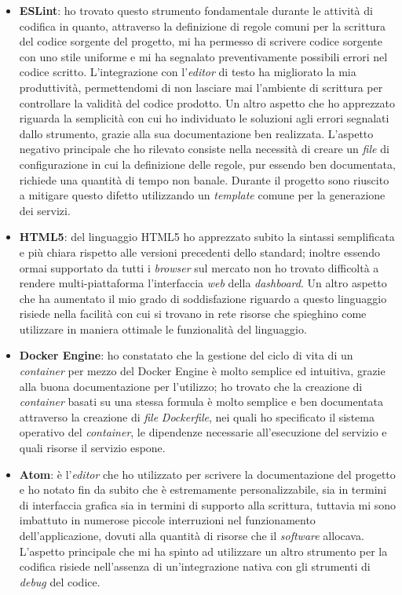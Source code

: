 \begin{itemize}
  \item \textbf{ESLint}: ho trovato questo strumento fondamentale durante le attività di codifica in quanto, attraverso la definizione di regole comuni per la scrittura del codice sorgente del progetto, mi ha permesso di scrivere codice sorgente con uno stile uniforme e mi ha segnalato preventivamente possibili errori nel codice scritto. L'integrazione con l'\emph{editor} di testo ha migliorato la mia produttività, permettendomi di non lasciare mai l'ambiente di scrittura per controllare la validità del codice prodotto. Un altro aspetto che ho apprezzato riguarda la semplicità con cui ho individuato le soluzioni agli errori segnalati dallo strumento, grazie alla sua documentazione ben realizzata. L'aspetto negativo principale che ho rilevato consiste nella necessità di creare un \emph{file} di configurazione in cui la definizione delle regole, pur essendo ben documentata, richiede una quantità di tempo non banale. Durante il progetto sono riuscito a mitigare questo difetto utilizzando un \emph{template} comune per la generazione dei servizi.
  \item \textbf{HTML5}: del linguaggio HTML5 ho apprezzato subito la sintassi semplificata e più chiara rispetto alle versioni precedenti dello standard; inoltre essendo ormai supportato da tutti i \emph{browser} sul mercato non ho trovato difficoltà a rendere multi-piattaforma l'interfaccia \emph{web} della \emph{dashboard}. Un altro aspetto che ha aumentato il mio grado di soddisfazione riguardo a questo linguaggio risiede nella facilità con cui si trovano in rete risorse che spieghino come utilizzare in maniera ottimale le funzionalità del linguaggio.
  \item \textbf{Docker Engine}: ho constatato che la gestione del ciclo di vita di un \emph{container} per mezzo del Docker Engine è molto semplice ed intuitiva, grazie alla buona documentazione per l'utilizzo; ho trovato che la creazione di \emph{container} basati su una stessa formula è molto semplice e ben documentata attraverso la creazione di \emph{file} \emph{Dockerfile}, nei quali ho specificato il sistema operativo del \emph{container}, le dipendenze necessarie all'esecuzione del servizio e quali risorse il servizio espone.
  \item \textbf{Atom}: è l'\emph{editor} che ho utilizzato per scrivere la documentazione del progetto e ho notato fin da subito che è estremamente personalizzabile, sia in termini di interfaccia grafica sia in termini di supporto alla scrittura, tuttavia mi sono imbattuto in numerose piccole interruzioni nel funzionamento dell'applicazione, dovuti alla quantità di risorse che il \emph{software} allocava. L'aspetto principale che mi ha spinto ad utilizzare un altro strumento per la codifica risiede nell'assenza di un'integrazione nativa con gli strumenti di \emph{debug} del codice.
\end{itemize}

